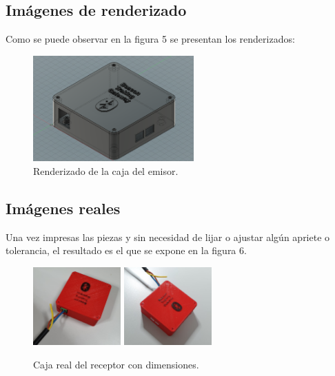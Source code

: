 \documentclass[paper=a4, fontsize=11pt,twoside]{scrartcl}
\begin{document}
    \subsection{Imágenes de renderizado}
        Como se puede observar en la figura 5 se presentan los renderizados:
        \begin{center}
            \begin{figure}[h]
                \centering
                \includegraphics[width=0.55\textwidth]{../mechanical_master.PNG}
                \caption{Renderizado de la caja del emisor.}
                \label{fig:mesh1}
            \end{figure}
        \end{center}
        \paragraph{}

    \subsection{Imágenes reales}
        Una vez impresas las piezas y sin necesidad de lijar o ajustar algún apriete o tolerancia,
        el resultado es el que se expone en la figura 6.
        \begin{center}
            \begin{figure}[h]
                \centering
                \includegraphics[width=0.3\textwidth]{../3d_master_1.jpeg}
                \includegraphics[width=0.3\textwidth]{../3d_master_2.jpeg}
                \caption{Caja real del receptor con dimensiones.}
                \label{fig:mesh1}
            \end{figure}
        \end{center}
\end{document}
